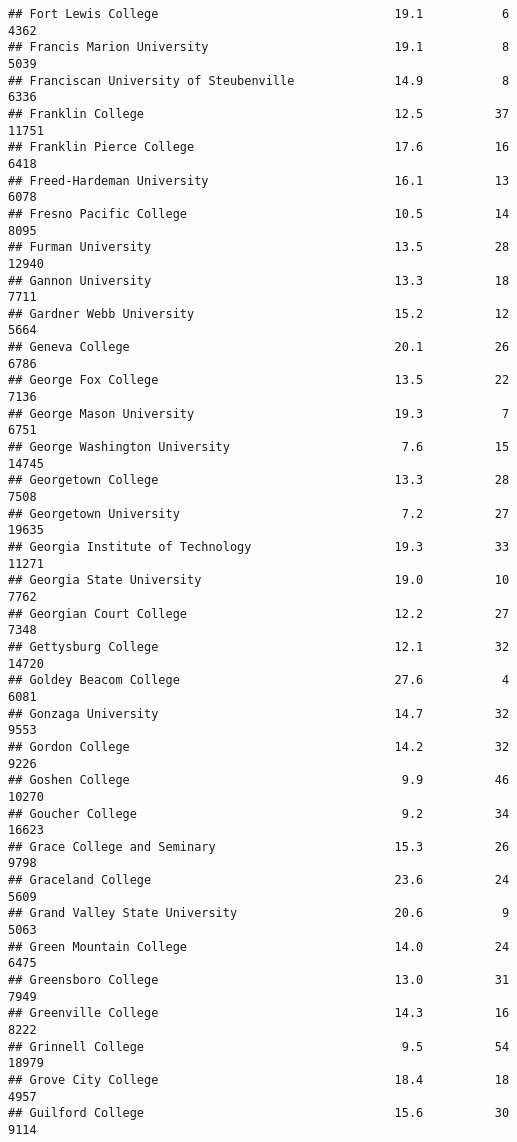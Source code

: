 \documentclass[
]{article}
\begin{document}
\begin{verbatim}
## Fort Lewis College                                 19.1           6   4362
## Francis Marion University                          19.1           8   5039
## Franciscan University of Steubenville              14.9           8   6336
## Franklin College                                   12.5          37  11751
## Franklin Pierce College                            17.6          16   6418
## Freed-Hardeman University                          16.1          13   6078
## Fresno Pacific College                             10.5          14   8095
## Furman University                                  13.5          28  12940
## Gannon University                                  13.3          18   7711
## Gardner Webb University                            15.2          12   5664
## Geneva College                                     20.1          26   6786
## George Fox College                                 13.5          22   7136
## George Mason University                            19.3           7   6751
## George Washington University                        7.6          15  14745
## Georgetown College                                 13.3          28   7508
## Georgetown University                               7.2          27  19635
## Georgia Institute of Technology                    19.3          33  11271
## Georgia State University                           19.0          10   7762
## Georgian Court College                             12.2          27   7348
## Gettysburg College                                 12.1          32  14720
## Goldey Beacom College                              27.6           4   6081
## Gonzaga University                                 14.7          32   9553
## Gordon College                                     14.2          32   9226
## Goshen College                                      9.9          46  10270
## Goucher College                                     9.2          34  16623
## Grace College and Seminary                         15.3          26   9798
## Graceland College                                  23.6          24   5609
## Grand Valley State University                      20.6           9   5063
## Green Mountain College                             14.0          24   6475
## Greensboro College                                 13.0          31   7949
## Greenville College                                 14.3          16   8222
## Grinnell College                                    9.5          54  18979
## Grove City College                                 18.4          18   4957
## Guilford College                                   15.6          30   9114

\end{verbatim}
\end{document}
